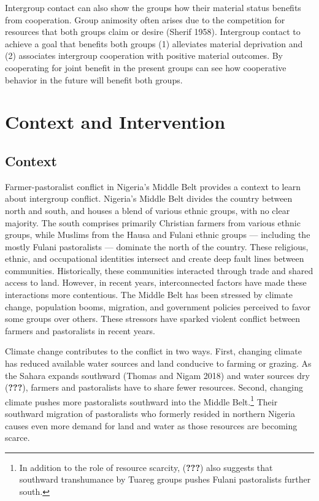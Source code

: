\documentclass[11pt]{article}
\begin{document}
Intergroup contact can also show the groups how their material status
benefits from cooperation. Group animosity often arises due to the
competition for resources that both groups claim or desire (Sherif
1958). Intergroup contact to achieve a goal that benefits both groups
(1) alleviates material deprivation and (2) associates intergroup
cooperation with positive material outcomes. By cooperating for joint
benefit in the present groups can see how cooperative behavior in the
future will benefit both groups.

\hypertarget{context-and-intervention}{%
\section{Context and Intervention}\label{context-and-intervention}}

\hypertarget{context}{%
\subsection{Context}\label{context}}

Farmer-pastoralist conflict in Nigeria's Middle Belt provides a context
to learn about intergroup conflict. Nigeria's Middle Belt divides the
country between north and south, and houses a blend of various ethnic
groups, with no clear majority. The south comprises primarily Christian
farmers from various ethnic groups, while Muslims from the Hausa and
Fulani ethnic groups --- including the mostly Fulani pastoralists ---
dominate the north of the country. These religious, ethnic, and
occupational identities intersect and create deep fault lines between
communities. Historically, these communities interacted through trade
and shared access to land. However, in recent years, interconnected
factors have made these interactions more contentious. The Middle Belt
has been stressed by climate change, population booms, migration, and
government policies perceived to favor some groups over others. These
stressors have sparked violent conflict between farmers and pastoralists
in recent years.

Climate change contributes to the conflict in two ways. First, changing
climate has reduced available water sources and land conducive to
farming or grazing. As the Sahara expands southward (Thomas and Nigam
2018) and water sources dry ({\textbf{???}}), farmers and pastoralists
have to share fewer resources. Second, changing climate pushes more
pastoralists southward into the Middle Belt.\footnote{In addition to the
  role of resource scarcity, ({\textbf{???}}) also suggests that
  southward transhumance by Tuareg groups pushes Fulani pastoralists
  further south.} Their southward migration of pastoralists who formerly
resided in northern Nigeria causes even more demand for land and water
as those resources are becoming scarce.
\end{document}
